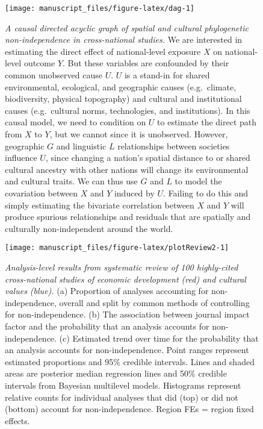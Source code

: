 \documentclass[
  man,floatsintext]{apa6}
\begin{document}
\begin{figure}[H]
\texttt{[image: manuscript\_files/figure-latex/dag-1]} \caption{\emph{A causal directed acyclic graph of spatial and cultural phylogenetic non-independence in cross-national studies.} We are interested in estimating the direct effect of national-level exposure \(X\) on national-level outcome \(Y\). But these variables are confounded by their common unobserved cause \(U\). \(U\) is a stand-in for shared environmental, ecological, and geographic causes (e.g.~climate, biodiversity, physical topography) and cultural and institutional causes (e.g.~cultural norms, technologies, and institutions). In this causal model, we need to condition on \(U\) to estimate the direct path from \(X\) to \(Y\), but we cannot since it is unobserved. However, geographic \(G\) and linguistic \(L\) relationships between societies influence \(U\), since changing a nation's spatial distance to or shared cultural ancestry with other nations will change its environmental and cultural traits. We can thus use \(G\) and \(L\) to model the covariation between \(X\) and \(Y\) induced by \(U\). Failing to do this and simply estimating the bivariate correlation between \(X\) and \(Y\) will produce spurious relationships and residuals that are spatially and culturally non-independent around the world.}\label{fig:dag}
\end{figure}

\newpage



\begin{figure}[H]
\texttt{[image: manuscript\_files/figure-latex/plotReview2-1]} \caption{\emph{Analysis-level results from systematic review of 100 highly-cited cross-national studies of economic development (red) and cultural values (blue).} (a) Proportion of analyses accounting for non-independence, overall and split by common methods of controlling for non-independence. (b) The association between journal impact factor and the probability that an analysis accounts for non-independence. (c) Estimated trend over time for the probability that an analysis accounts for non-independence. Point ranges represent estimated proportions and 95\% credible intervals. Lines and shaded areas are posterior median regression lines and 50\% credible intervals from Bayesian multilevel models. Histograms represent relative counts for individual analyses that did (top) or did not (bottom) account for non-independence. Region FEs = region fixed effects.}\label{fig:plotReview2}
\end{figure}
\end{document}
